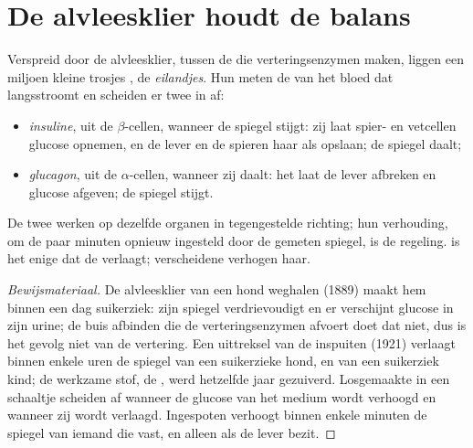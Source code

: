 \section{De alvleesklier houdt de balans}

\begin{proposition}\label{prop:g12:glucose-and-diabetes:hormones}
Verspreid door de alvleesklier, tussen de  die verteringsenzymen
maken, liggen een miljoen kleine trosjes , de \emph{eilandjes}.
Hun  meten de  van het bloed dat langsstroomt en
scheiden er twee  in af:
\begin{itemize}
  \item \emph{insuline}, uit de $\beta$-cellen, wanneer de
        spiegel stijgt: zij laat spier- en vetcellen glucose opnemen, en
        de lever en de spieren haar als  opslaan; de spiegel
        daalt;
  \item \emph{glucagon}, uit de $\alpha$-cellen, wanneer
        zij daalt: het laat de lever  afbreken en glucose
        afgeven; de spiegel stijgt.
\end{itemize}
De twee werken op dezelfde organen in tegengestelde richting; hun
verhouding, om de paar minuten opnieuw ingesteld door de gemeten spiegel,
is de regeling.  is het enige  dat de 
verlaagt; verscheidene verhogen haar.
\end{proposition}
\begin{proof}[Bewijsmateriaal]
De alvleesklier van een hond weghalen (1889) maakt hem binnen een dag
suikerziek: zijn spiegel verdrievoudigt en er verschijnt glucose in zijn
urine; de buis afbinden die de verteringsenzymen afvoert doet dat niet,
dus is het gevolg niet van de vertering. Een uittreksel van de 
inspuiten (1921) verlaagt binnen enkele uren de spiegel van een
suikerzieke hond, en van een suikerziek kind; de werkzame stof, de
, werd hetzelfde jaar gezuiverd. Losgemaakte  in een
schaaltje scheiden  af wanneer de glucose van het medium wordt
verhoogd en  wanneer zij wordt verlaagd. Ingespoten 
verhoogt binnen enkele minuten de spiegel van iemand die vast, en alleen
als de lever  bezit.
\end{proof}

